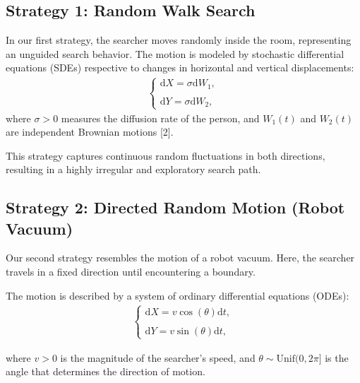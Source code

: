 \documentclass{article}
\begin{document}
\subsection{Strategy 1: Random Walk Search}

\noindent In our first strategy, the searcher moves randomly inside the room, representing an unguided search behavior. The motion is modeled by stochastic differential equations (SDEs) respective to changes in horizontal and vertical displacements:
\begin{align*}
    \begin{cases}
        \mathrm{d}X = \sigma \mathrm{d}W_1, \\
        \\
        \mathrm{d}Y = \sigma \mathrm{d}W_2,
    \end{cases}   \tag{2.2}
\end{align*}
\noindent where $\sigma > 0$ measures the diffusion rate of the person, and $W_1(t)$ and $W_2(t)$ are independent Brownian motions [2]. 

\vspace{5mm}

\noindent This strategy captures continuous random fluctuations in both directions, resulting in a highly irregular and exploratory search path.


\subsection{Strategy 2: Directed Random Motion (Robot Vacuum)}

\noindent Our second strategy resembles the motion of a robot vacuum. Here, the searcher travels in a fixed direction until encountering a boundary.

\vspace{5mm}

\noindent The motion is described by a system of ordinary differential equations (ODEs):
\begin{align*}
    \begin{cases}
        \mathrm{d}X = v \cos(\theta)\mathrm{d}t, \\
        \\
        \mathrm{d}Y = v \sin(\theta)\mathrm{d}t,
    \end{cases}   \tag{2.3}
\end{align*}

\noindent where $v > 0$ is the magnitude of the searcher's speed, and $\theta \sim \text{Unif}(0, 2\pi]$ is the angle that determines the direction of motion. 
\end{document}
